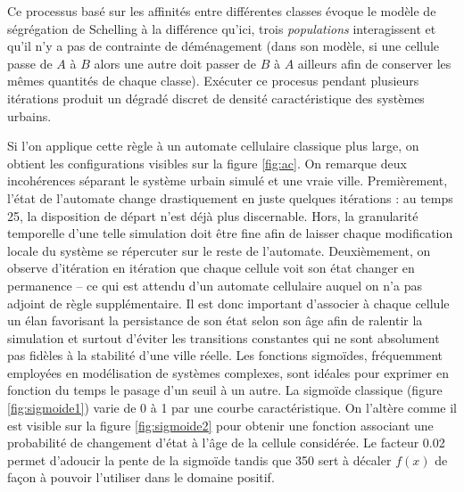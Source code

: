 \documentclass[12pt]{article}
\begin{document}
Ce processus basé sur les affinités entre différentes classes évoque
le modèle de ségrégation de Schelling à la différence qu'ici, trois
\textit{populations} interagissent et qu'il n'y a pas de contrainte de
déménagement (dans son modèle, si une cellule passe de $A$ à $B$ alors
une autre doit passer de $B$ à $A$ ailleurs afin de conserver les
mêmes quantités de chaque classe). Exécuter ce procesus pendant
plusieurs itérations produit un dégradé discret de densité
caractéristique des systèmes urbains.

Si l'on applique cette règle à un automate cellulaire classique plus
large, on obtient les configurations visibles sur la figure
\ref{fig:ac}. On remarque deux incohérences séparant le système urbain
simulé et une vraie ville. Premièrement, l'état de l'automate change
drastiquement en juste quelques itérations : au temps 25, la
disposition de départ n'est déjà plus discernable. Hors, la
granularité temporelle d'une telle simulation doit être fine afin de
laisser chaque modification locale du système se répercuter sur le
reste de l'automate. Deuxièmement, on observe d'itération en itération
que chaque cellule voit son état changer en permanence -- ce qui est
attendu d'un automate cellulaire auquel on n'a pas adjoint de règle
supplémentaire. Il est donc important d'associer à chaque cellule un
élan favorisant la persistance de son état selon son âge afin de
ralentir la simulation et surtout d'éviter les transitions constantes
qui ne sont absolument pas fidèles à la stabilité d'une ville
réelle. Les fonctions sigmoïdes, fréquemment employées en modélisation
de systèmes complexes, sont idéales pour exprimer en fonction du temps
le pasage d'un seuil à un autre. La sigmoïde classique (figure
\ref{fig:sigmoide1}) varie de 0 à 1 par une courbe caractéristique. On
l'altère comme il est visible sur la figure \ref{fig:sigmoide2} pour
obtenir une fonction associant une probabilité de changement d'état à
l'âge de la cellule considérée. Le facteur 0.02 permet d'adoucir la
pente de la sigmoïde tandis que 350 sert à décaler $f(x)$ de façon à
pouvoir l'utiliser dans le domaine positif.
\end{document}

